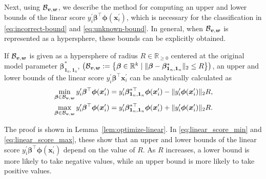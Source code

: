 %
%
Next, using ${\cal B}_{\bm{v}, \bm{w}}$, we describe the method for computing an upper and lower bounds of the linear score $y_i^{\prime} \bm{\beta}^\top \bm\phi(\bm x^{\prime}_{i})$, which is necessary for the classification in \eqref{eq:incorrect-bound} and \eqref{eq:unknown-bound}.
%
%
In general, when ${\cal B}_{\bm{v}, \bm{w}}$ is represented as a hypersphere, these bounds can be explicitly obtained.
%
\begin{lemma}\label{lem:linear_score}
	If ${\cal B}_{\bm{v}, \bm{w}}$ is given as a hypersphere of radius $R \in \mathbb{R}_{\geq0}$ centered at the original model parameter $\bm{\beta}_{\bm 1_n, \bm 1_n}^*$,
	$\left({\cal B}_{\bm{v}, \bm{w}} :=\left\{\bm\beta \in \mathbb{R}^k \mid\|\bm\beta-\bm{\beta}_{\bm{1}_n, \bm{1}_n}^{*}\|_2 \leq R\right\}\right)$, an upper and lower bounds of the linear score $y_i^{\prime} \bm \beta^\top \bm x^{\prime}_i$ can be analytically calculated as
	\begin{align}
		& \min_{\bm{\beta} \in {\cal B}_{\bm{v}, \bm{w}}} y_i^{\prime}\bm{\beta}^\top \bm\phi(\bm x^{\prime}_i) = y_i^{\prime}\bm{\beta}_{\bm 1_n, \bm 1_n}^{*\top} \bm\phi(\bm x^{\prime}_i) -\|y_i^{\prime}\bm\phi(\bm x^{\prime}_i)\|_2 R, \label{eq:linear_score_min}\\
		& \max_{\bm{\beta} \in {\cal B}_{\bm{v}, \bm{w}}} y_i^{\prime}\bm{\beta}^\top \bm\phi(\bm x^{\prime}_i) = y_i^{\prime}\bm{\beta}_{\bm 1_n, \bm 1_n}^{*\top} \bm\phi(\bm x^{\prime}_i) + \|y_i^{\prime}\bm\phi(\bm x^{\prime}_i)\|_2 R.\label{eq:linear_score_max}
	\end{align}
\end{lemma}
%
The proof is shown in Lemma~\ref{lem:optimize-linear}.
%
%
In \eqref{eq:linear_score_min} and \eqref{eq:linear_score_max}, these show that an upper and lower bounds of the linear score $y_i^{\prime}\bm{\beta}^\top \bm\phi(\bm x^{\prime}_{i})$ depend on the value of $R$.
%
%
As $R$ increases, a lower bound is more likely to take negative values, while an upper bound is more likely to take positive values.
%



